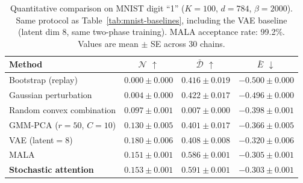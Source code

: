 \begin{table}[h]
\centering
\caption{Quantitative comparison on MNIST digit ``1'' ($K{=}100$, $d{=}784$, $\beta{=}2000$). Same protocol as Table~\ref{tab:mnist-baselines}, including the VAE baseline (latent dim 8, same two-phase training). MALA acceptance rate: 99.2\%. Values are mean $\pm$ SE across 30 chains.}
\label{tab:mnist-digit1}
\small
\begin{tabular}{@{}lccc@{}}
\toprule
Method & $\mathcal{N}$ $\uparrow$ & $\bar{\mathcal{D}}$ $\uparrow$ & $\bar{E}$ $\downarrow$ \\
\midrule
Bootstrap (replay)          & $0.000 \pm 0.000$ & $0.416 \pm 0.019$ & $-0.500 \pm 0.000$ \\
Gaussian perturbation       & $0.004 \pm 0.000$ & $0.422 \pm 0.017$ & $-0.496 \pm 0.000$ \\
Random convex combination   & $0.097 \pm 0.001$ & $0.007 \pm 0.000$ & $-0.398 \pm 0.001$ \\
GMM-PCA ($r{=}50$, $C{=}10$) & $0.130 \pm 0.005$ & $0.401 \pm 0.017$ & $-0.366 \pm 0.005$ \\
VAE (latent${=}8$)          & $0.180 \pm 0.006$ & $0.408 \pm 0.008$ & $-0.320 \pm 0.006$ \\
MALA                        & $0.151 \pm 0.001$ & $0.586 \pm 0.001$ & $-0.305 \pm 0.001$ \\
\textbf{Stochastic attention} & $\mathbf{0.153 \pm 0.001}$ & $\mathbf{0.591 \pm 0.001}$ & $\mathbf{-0.303 \pm 0.001}$ \\
\bottomrule
\end{tabular}
\end{table}

